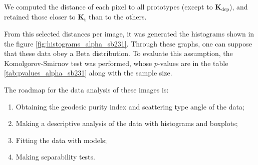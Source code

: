 \documentclass[journal]{IEEEtran}
\begin{document}
We computed the distance of each pixel to all prototypes (except to $\bm K_{\text{dep}}$), and retained those closer to $\bm K_{\text{t}}$ than to the others.

\textcolor{red}{\hrulefill}

From this selected distances per image, it was generated the histograms shown in the figure \ref{fig:histograms_alpha_sb231}. Through these graphs, one can suppose that these data obey a Beta distribution. To evaluate this assumption, the Komolgorov-Smirnov test was performed, whose $p$-values are in the table \ref{tab:pvalues_alpha_sb231} along with the sample size.

The roadmap for the data analysis of these images is:
\begin{enumerate}
  \item Obtaining the geodesic purity index and scattering type angle of the data;
  \item Making a descriptive analysis of the data with histograms and boxplots;
  \item Fitting the data with models;
  \item Making separability tests.
\end{enumerate}


% 

\end{document}
